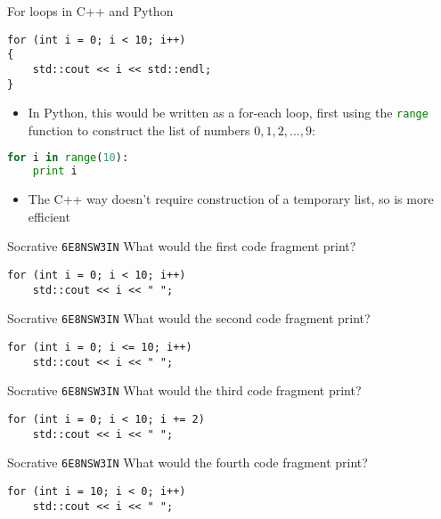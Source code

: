\begin{frame}[fragile]{For loops in C++ and Python}
	\begin{lstlisting}
for (int i = 0; i < 10; i++)
{
    std::cout << i << std::endl;
}
	\end{lstlisting}
	\pause
    \begin{itemize}
        \item In Python, this would be written as a for-each loop, first using the \lstinline[language=Python]{range} function
        to construct the list of numbers $0, 1, 2, \dots, 9$:
    \end{itemize}
	\begin{lstlisting}[language=Python]
for i in range(10):
    print i
	\end{lstlisting}
	\pause
    \begin{itemize}
        \item The C++ way doesn't require construction of a temporary list, so is more efficient
    \end{itemize}
\end{frame}

\begin{frame}[fragile]{Socrative \texttt{6E8NSW3IN}}
    What would the first code fragment print?
	\begin{lstlisting}
for (int i = 0; i < 10; i++)
    std::cout << i << " ";
	\end{lstlisting}
\end{frame}

\begin{frame}[fragile]{Socrative \texttt{6E8NSW3IN}}
    What would the second code fragment print?
	\begin{lstlisting}
for (int i = 0; i <= 10; i++)
    std::cout << i << " ";
	\end{lstlisting}
\end{frame}

\begin{frame}[fragile]{Socrative \texttt{6E8NSW3IN}}
    What would the third code fragment print?
	\begin{lstlisting}
for (int i = 0; i < 10; i += 2)
    std::cout << i << " ";
	\end{lstlisting}
\end{frame}

\begin{frame}[fragile]{Socrative \texttt{6E8NSW3IN}}
    What would the fourth code fragment print?
	\begin{lstlisting}
for (int i = 10; i < 0; i++)
    std::cout << i << " ";
	\end{lstlisting}
\end{frame}

